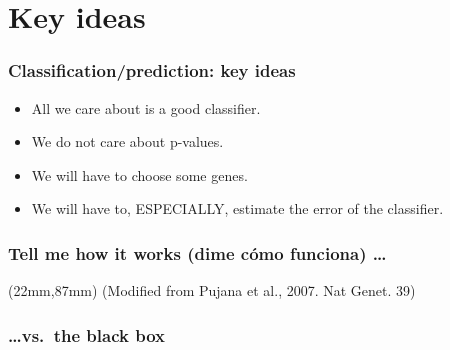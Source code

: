 \section{Key ideas}
\begin{frame}
\frametitle{Classification/prediction: key ideas}
\begin{itemize}
\item All we care about is a good classifier.
\item We do not care about p-values.
\item We will have to choose some genes.
\item We will have to, ESPECIALLY, estimate the error of the classifier.
\end{itemize}
\end{frame} 


\begin{frame}
\frametitle{Tell me how it works (dime c\'omo funciona) \ldots}
  \begin{textblock*}{53mm}(22mm,87mm)
    {\tiny(Modified from Pujana et al., 2007. Nat Genet. 39)}
  \end{textblock*}
\end{frame}



\begin{frame}
\frametitle{\ldots vs.\ the black box}
\end{frame}




